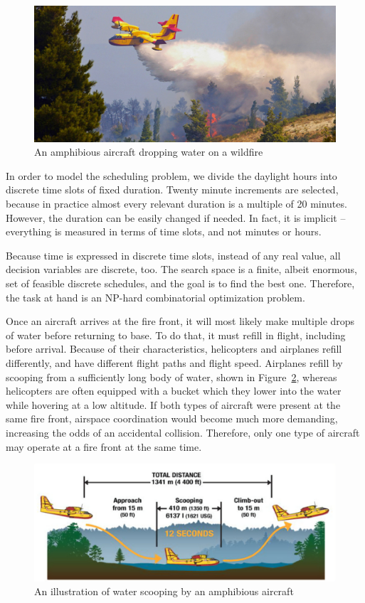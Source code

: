\begin{figure}[tb]
    \centering
    \includegraphics[width=0.95\linewidth]{img/canadair-drop.jpg}
    \caption{An amphibious aircraft dropping water on a wildfire~\cite{Viking/CL415Sheet}}
    \label{fig:canadair-drop}
\end{figure}

In order to model the scheduling problem, we divide the daylight hours into discrete time slots of fixed duration.
Twenty minute increments are selected, because in practice almost every relevant duration is a multiple of 20 minutes.
However, the duration can be easily changed if needed.
In fact, it is implicit -- everything is measured in terms of time slots, and not minutes or hours.

Because time is expressed in discrete time slots, instead of any real value, all decision variables are discrete, too.
The search space is a finite, albeit enormous, set of feasible discrete schedules, and the goal is to find the best one.
Therefore, the task at hand is an NP-hard combinatorial optimization problem.

Once an aircraft arrives at the fire front, it will most likely make multiple drops of water before returning to base.
To do that, it must refill in flight, including before arrival.
Because of their characteristics, helicopters and airplanes refill differently, and have different flight paths and flight speed.
Airplanes refill by scooping from a sufficiently long body of water, shown in Figure~\ref{fig:scooping}, whereas helicopters are often equipped with a bucket which they lower into the water while hovering at a low altitude.
If both types of aircraft were present at the same fire front, airspace coordination would become much more demanding, increasing the odds of an accidental collision.
Therefore, only one type of aircraft may operate at a fire front at the same time.

\begin{figure}[htb]
    \centering
    \includegraphics[width=0.95\linewidth]{img/scooping.jpg}
    \caption{An illustration of water scooping by an amphibious aircraft~\cite{Viking/Technique}}
    \label{fig:scooping}
\end{figure}

